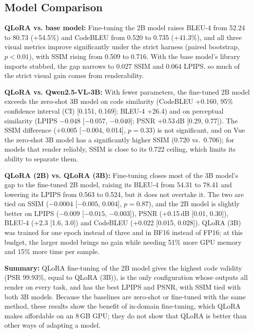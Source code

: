 \documentclass[conference,a4paper]{IEEEtran}
\begin{document}
\subsection{Model Comparison}
\label{subsec:comparison}

\textbf{QLoRA vs. base model:} Fine-tuning the 2B model raises BLEU-4 from 52.24 to 80.73 (+54.5\%) and CodeBLEU from 0.520 to 0.735 (+41.3\%), and all three visual metrics improve significantly under the strict harness (paired bootstrap, $p<0.01$), with SSIM rising from 0.509 to 0.716. With the base model's library imports stubbed, the gap narrows to 0.027 SSIM and 0.064 LPIPS, so much of the strict visual gain comes from renderability.

\textbf{QLoRA vs. Qwen2.5-VL-3B:} With fewer parameters, the fine-tuned 2B model exceeds the zero-shot 3B model on code similarity (CodeBLEU +0.160, 95\% confidence interval (CI) [0.151, 0.169]; BLEU-4 +26.4) and on perceptual similarity (LPIPS $-0.048$ [$-0.057$, $-0.040$]; PSNR +0.53\,dB [0.29, 0.77]). The SSIM difference (+0.005 [$-0.004$, 0.014], $p=0.33$) is not significant, and on Vue the zero-shot 3B model has a significantly higher SSIM (0.720 vs.\ 0.706); for models that render reliably, SSIM is close to its 0.722 ceiling, which limits its ability to separate them.

\textbf{QLoRA (2B) vs. QLoRA (3B):} Fine-tuning closes most of the 3B model's gap to the fine-tuned 2B model, raising its BLEU-4 from 54.31 to 78.41 and lowering its LPIPS from 0.563 to 0.524, but it does not overtake it. The two are tied on SSIM ($-0.0004$ [$-0.005$, 0.004], $p=0.87$), and the 2B model is slightly better on LPIPS ($-0.009$ [$-0.015$, $-0.003$]), PSNR (+0.15\,dB [0.01, 0.30]), BLEU-4 (+2.3 [1.6, 3.0]) and CodeBLEU (+0.022 [0.015, 0.028]). QLoRA (3B) was trained for one epoch instead of three and in BF16 instead of FP16; at this budget, the larger model brings no gain while needing 51\% more GPU memory and 15\% more time per sample.

\textbf{Summary:} QLoRA fine-tuning of the 2B model gives the highest code validity (PSR 99.93\%, equal to QLoRA (3B)), is the only configuration whose outputs all render on every task, and has the best LPIPS and PSNR, with SSIM tied with both 3B models. Because the baselines are zero-shot or fine-tuned with the same method, these results show the benefit of in-domain fine-tuning, which QLoRA makes affordable on an 8\,GB GPU; they do not show that QLoRA is better than other ways of adapting a model.
\end{document}
